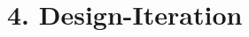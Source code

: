 \documentclass[.../Dokumentation.tex]{subfiles}
\begin{document}
    \section{4. Design-Iteration}\label{sec-ita4}
\end{document}
